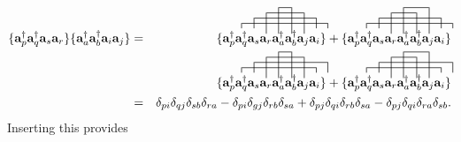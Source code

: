 \documentclass[a4paper,norsk,11pt,twoside]{report}
\begin{document}
\begin{align}
\{
\textbf{a}^{\dag}_p \textbf{a}^{\dag}_q
\textbf{a}_s \textbf{a}_r \}
\{
\textbf{a}^{\dag}_a \textbf{a}^{\dag}_b
\textbf{a}_i \textbf{a}_j \} & = &
\{
\contraction[5ex]{\textbf{a}^{\dag}_p \textbf{a}^{\dag}_q 
\textbf{a}_s}{\textbf{a}_r}{}{\textbf{a}^{\dag}_a}
\contraction[4ex]{\textbf{a}^{\dag}_p \textbf{a}^{\dag}_q}{\textbf{a}_s}{\textbf{a}_r
\textbf{a}^{\dag}_a}{\textbf{a}^{\dag}_b}
\contraction[2ex]{\textbf{a}^{\dag}_p}{\textbf{a}^{\dag}_q}{\textbf{a}_s \textbf{a}_r
\textbf{a}^{\dag}_a \textbf{a}^{\dag}_b}{\textbf{a}_j}
\contraction{}{\textbf{a}^{\dag}_p}{\textbf{a}^{\dag}_q 
\textbf{a}_s \textbf{a}_r \textbf{a}^{\dag}_a \textbf{a}^{\dag}_b \textbf{a}_j}{\textbf{a}_i}
\textbf{a}^{\dag}_p \textbf{a}^{\dag}_q 
\textbf{a}_s \textbf{a}_r
\textbf{a}^{\dag}_a \textbf{a}^{\dag}_b
\textbf{a}_j \textbf{a}_i
\}
+
\{
\contraction[4ex]{\textbf{a}^{\dag}_p \textbf{a}^{\dag}_q}{\textbf{a}_s}{\textbf{a}_r}{\textbf{a}^{\dag}_a}
\contraction[5ex]{\textbf{a}^{\dag}_p \textbf{a}^{\dag}_q 
\textbf{a}_s}{\textbf{a}_r}{\textbf{a}^{\dag}_a}{\textbf{a}^{\dag}_b}
\contraction[2ex]{\textbf{a}^{\dag}_p}{\textbf{a}^{\dag}_q}{\textbf{a}_s \textbf{a}_r
\textbf{a}^{\dag}_a \textbf{a}^{\dag}_b}{\textbf{a}_j}
\contraction{}{\textbf{a}^{\dag}_p}{\textbf{a}^{\dag}_q 
\textbf{a}_s \textbf{a}_r \textbf{a}^{\dag}_a \textbf{a}^{\dag}_b \textbf{a}_j}{\textbf{a}_i}
\textbf{a}^{\dag}_p \textbf{a}^{\dag}_q 
\textbf{a}_s \textbf{a}_r
\textbf{a}^{\dag}_a \textbf{a}^{\dag}_b
\textbf{a}_j \textbf{a}_i
\} \nonumber \\ & &
\{
\contraction[5ex]{\textbf{a}^{\dag}_p \textbf{a}^{\dag}_q 
\textbf{a}_s}{\textbf{a}_r}{}{\textbf{a}^{\dag}_a}
\contraction[4ex]{\textbf{a}^{\dag}_p \textbf{a}^{\dag}_q}{\textbf{a}_s}{\textbf{a}_r
\textbf{a}^{\dag}_a}{\textbf{a}^{\dag}_b}
\contraction[2ex]{\textbf{a}^{\dag}_p}{\textbf{a}^{\dag}_q}{\textbf{a}_s \textbf{a}_r
\textbf{a}^{\dag}_a \textbf{a}^{\dag}_b\textbf{a}_j}{\textbf{a}_i}
\contraction{}{\textbf{a}^{\dag}_p}{\textbf{a}^{\dag}_q 
\textbf{a}_s \textbf{a}_r \textbf{a}^{\dag}_a \textbf{a}^{\dag}_b}{\textbf{a}_j}
\textbf{a}^{\dag}_p \textbf{a}^{\dag}_q 
\textbf{a}_s \textbf{a}_r
\textbf{a}^{\dag}_a \textbf{a}^{\dag}_b
\textbf{a}_j \textbf{a}_i
\}
+
\{
\contraction[4ex]{\textbf{a}^{\dag}_p \textbf{a}^{\dag}_q}{\textbf{a}_s}{\textbf{a}_r}{\textbf{a}^{\dag}_a}
\contraction[5ex]{\textbf{a}^{\dag}_p \textbf{a}^{\dag}_q 
\textbf{a}_s}{\textbf{a}_r}{\textbf{a}^{\dag}_a}{\textbf{a}^{\dag}_b}
\contraction[2ex]{\textbf{a}^{\dag}_p}{\textbf{a}^{\dag}_q}{\textbf{a}_s \textbf{a}_r
\textbf{a}^{\dag}_a \textbf{a}^{\dag}_b\textbf{a}_j}{\textbf{a}_i}
\contraction{}{\textbf{a}^{\dag}_p}{\textbf{a}^{\dag}_q 
\textbf{a}_s \textbf{a}_r \textbf{a}^{\dag}_a \textbf{a}^{\dag}_b}{\textbf{a}_j}
\textbf{a}^{\dag}_p \textbf{a}^{\dag}_q 
\textbf{a}_s \textbf{a}_r
\textbf{a}^{\dag}_a \textbf{a}^{\dag}_b
\textbf{a}_j \textbf{a}_i
\} \nonumber \\
& = & \delta_{pi} \delta_{qj} \delta_{sb} \delta_{ra} 
- \delta_{pi} \delta_{gj} \delta_{rb} \delta_{sa}
+ \delta_{pj} \delta_{qi} \delta_{rb} \delta_{sa}
- \delta_{pj} \delta_{qi} \delta_{ra} \delta_{sb} .
\end{align}
Inserting this provides
\end{document}
